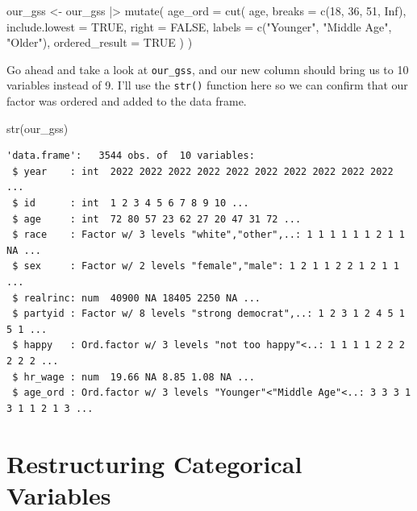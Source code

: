 \documentclass[
  letterpaper,
  DIV=11,
  numbers=noendperiod]{scrreprt}
\newenvironment{Shaded}{\begin{snugshade}}{\end{snugshade}}
\newcommand{\AttributeTok}[1]{\textcolor[rgb]{0.40,0.45,0.13}{#1}}
\newcommand{\ConstantTok}[1]{\textcolor[rgb]{0.56,0.35,0.01}{#1}}
\newcommand{\DecValTok}[1]{\textcolor[rgb]{0.68,0.00,0.00}{#1}}
\newcommand{\FunctionTok}[1]{\textcolor[rgb]{0.28,0.35,0.67}{#1}}
\newcommand{\NormalTok}[1]{\textcolor[rgb]{0.00,0.23,0.31}{#1}}
\newcommand{\OtherTok}[1]{\textcolor[rgb]{0.00,0.23,0.31}{#1}}
\newcommand{\SpecialCharTok}[1]{\textcolor[rgb]{0.37,0.37,0.37}{#1}}
\newcommand{\StringTok}[1]{\textcolor[rgb]{0.13,0.47,0.30}{#1}}
\begin{document}
\begin{Shaded}
\begin{Highlighting}[]
\NormalTok{our\_gss }\OtherTok{\textless{}{-}}\NormalTok{ our\_gss }\SpecialCharTok{|\textgreater{}}
  \FunctionTok{mutate}\NormalTok{(}
    \AttributeTok{age\_ord =} \FunctionTok{cut}\NormalTok{(}
\NormalTok{      age,}
      \AttributeTok{breaks =} \FunctionTok{c}\NormalTok{(}\DecValTok{18}\NormalTok{, }\DecValTok{36}\NormalTok{, }\DecValTok{51}\NormalTok{, }\ConstantTok{Inf}\NormalTok{),}
      \AttributeTok{include.lowest =} \ConstantTok{TRUE}\NormalTok{,}
      \AttributeTok{right =} \ConstantTok{FALSE}\NormalTok{,}
      \AttributeTok{labels =} \FunctionTok{c}\NormalTok{(}\StringTok{"Younger"}\NormalTok{, }\StringTok{"Middle Age"}\NormalTok{, }\StringTok{"Older"}\NormalTok{),}
      \AttributeTok{ordered\_result =} \ConstantTok{TRUE}
\NormalTok{    )}
\NormalTok{  )}
\end{Highlighting}
\end{Shaded}

Go ahead and take a look at \texttt{our\_gss}, and our new column should
bring us to 10 variables instead of 9. I'll use the \texttt{str()}
function here so we can confirm that our factor was ordered and added to
the data frame.

\begin{Shaded}
\begin{Highlighting}[]
\FunctionTok{str}\NormalTok{(our\_gss)}
\end{Highlighting}
\end{Shaded}

\begin{verbatim}
'data.frame':   3544 obs. of  10 variables:
 $ year    : int  2022 2022 2022 2022 2022 2022 2022 2022 2022 2022 ...
 $ id      : int  1 2 3 4 5 6 7 8 9 10 ...
 $ age     : int  72 80 57 23 62 27 20 47 31 72 ...
 $ race    : Factor w/ 3 levels "white","other",..: 1 1 1 1 1 1 2 1 1 NA ...
 $ sex     : Factor w/ 2 levels "female","male": 1 2 1 1 2 2 1 2 1 1 ...
 $ realrinc: num  40900 NA 18405 2250 NA ...
 $ partyid : Factor w/ 8 levels "strong democrat",..: 1 2 3 1 2 4 5 1 5 1 ...
 $ happy   : Ord.factor w/ 3 levels "not too happy"<..: 1 1 1 1 2 2 2 2 2 2 ...
 $ hr_wage : num  19.66 NA 8.85 1.08 NA ...
 $ age_ord : Ord.factor w/ 3 levels "Younger"<"Middle Age"<..: 3 3 3 1 3 1 1 2 1 3 ...
\end{verbatim}

\section{Restructuring Categorical
Variables}\label{restructuring-categorical-variables}
\end{document}
